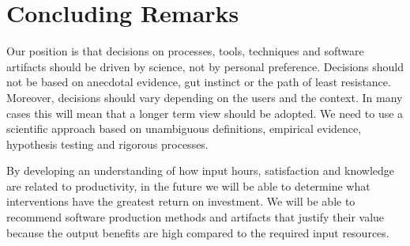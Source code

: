 \documentclass[sigconf, authorversion, nonacm]{acmart}
\begin{document}
\section{Concluding Remarks}

Our position is that decisions on processes, tools, techniques and software
artifacts should be driven by science, not by personal preference.  Decisions
should not be based on anecdotal evidence, gut instinct or the path of least
resistance.  Moreover, decisions should vary depending on the users and the
context.  In many cases this will mean that a longer term view should be
adopted.  We need to use a scientific approach based on unambiguous definitions,
empirical evidence, hypothesis testing and rigorous processes.

By developing an understanding of how input hours, satisfaction and knowledge
are related to productivity, in the future we will be able to determine what
interventions have the greatest return on investment.  We will be able to
recommend software production methods and artifacts that justify their value
because the output benefits are high compared to the required input resources.  




\end{document}
